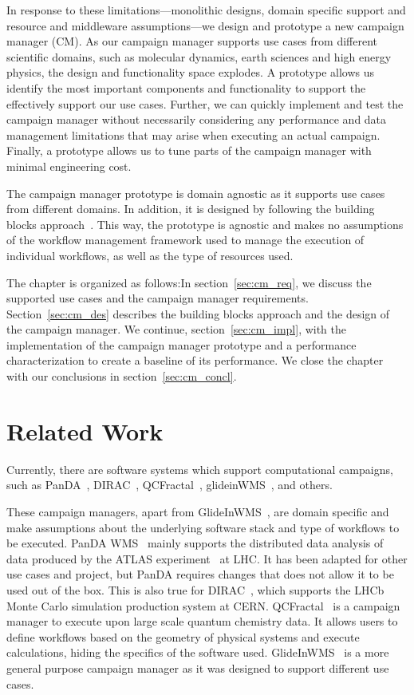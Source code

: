 In response to these limitations---monolithic designs, domain specific support 
and resource and middleware assumptions---we design and prototype a new 
campaign manager (CM). As our campaign manager supports use cases from 
different scientific domains, such as molecular dynamics, earth sciences and 
high energy physics, the design and functionality space explodes. A prototype 
allows us identify the most important components and functionality to support 
the effectively support our use cases. Further, we can quickly implement and 
test the campaign manager without necessarily considering any performance and 
data management limitations that may arise when executing an actual campaign.
Finally, a prototype allows us to tune parts of the campaign manager with 
minimal engineering cost.

The campaign manager prototype is domain agnostic as it supports use cases 
from different domains. In addition, it is designed by following the building 
blocks approach~\cite{turilli2019middleware}. This way, the prototype is 
agnostic and makes no assumptions of the workflow management framework used to 
manage the execution of individual workflows, as well as the type of resources 
used.

The chapter is organized as follows:In section~\ref{sec:cm_req}, we discuss 
the supported use cases and the campaign manager requirements. 
Section~\ref{sec:cm_des} describes the building blocks approach and the design 
of the campaign manager. We continue, section~\ref{sec:cm_impl}, with the 
implementation of the campaign manager prototype and a performance 
characterization to create a baseline of its performance. We close the chapter 
with our conclusions in section~\ref{sec:cm_concl}.

\section{Related Work}
Currently, there are software systems which support computational campaigns, 
such as PanDA~\cite{maeno2008panda}, DIRAC~\cite{casajus2010dirac}, 
QCFractal~\cite{qcfractal}, glideinWMS~\cite{sfiligoi2008glidein}, and others.

These campaign managers, apart from GlideInWMS~\cite{sfiligoi2008glidein}, are 
domain specific and make assumptions about the underlying software stack and 
type of workflows to be executed. PanDA WMS~\cite{maeno2008panda} mainly 
supports the distributed data analysis of data produced by the ATLAS 
experiment~\cite{atlas} at LHC. It has been adapted for other use cases and 
project, but PanDA requires changes that does not allow it to be used out of 
the box. This is also true for DIRAC~\cite{tsaregorodtsev2003dirac}, which 
supports the LHCb Monte Carlo simulation production system at CERN.
QCFractal~\cite{qcfractal} is a campaign manager to execute upon large scale 
quantum chemistry data. It allows users to define workflows based on the 
geometry of physical systems and execute calculations, hiding the specifics of 
the software used. GlideInWMS~\cite{sfiligoi2008glidein} is a more general 
purpose campaign manager as it was designed to support different use cases.

